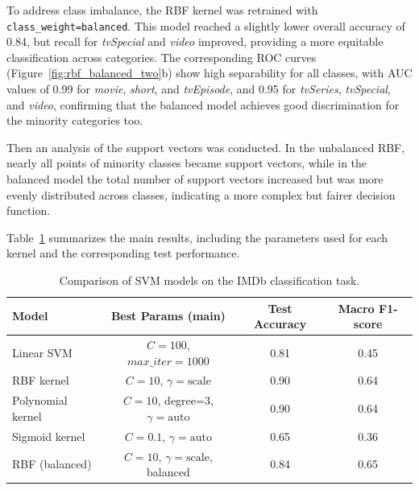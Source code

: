 

To address class imbalance, the RBF kernel was retrained with \texttt{class\_weight=balanced}.
This model reached a slightly lower overall accuracy of 0.84, 
but recall for \textit{tvSpecial} and \textit{video} improved, providing a more equitable classification across categories.  
The corresponding ROC curves (Figure~\ref{fig:rbf_balanced_two}b) show high separability for all classes, 
with AUC values of 0.99 for \textit{movie}, \textit{short}, and \textit{tvEpisode}, and 0.95 for \textit{tvSeries}, 
\textit{tvSpecial}, and \textit{video}, confirming that the balanced model achieves good discrimination 
for the minority categories too. 

Then an analysis of the support vectors was conducted.
In the unbalanced RBF, nearly all points of minority classes became support vectors, 
while in the balanced model the total number of support vectors increased but was more evenly distributed across classes, 
indicating a more complex but fairer decision function. 

Table~\ref{tab:svm_results} summarizes the main results, including the parameters used for each kernel and the corresponding test performance. 


\begin{table}[h]
\centering
\caption{Comparison of SVM models on the IMDb classification task.}
\label{tab:svm_results}
\begin{tabular}{lccc}
\hline
\textbf{Model} & \textbf{Best Params (main)} & \textbf{Test Accuracy} & \textbf{Macro F1-score} \\
\hline
Linear SVM & $C=100$, $max\_iter=1000$ & 0.81 & 0.45 \\
RBF kernel & $C=10$, $\gamma=\text{scale}$ & 0.90 & 0.64 \\
Polynomial kernel & $C=10$, degree=3, $\gamma=\text{auto}$ & 0.90 & 0.64 \\
Sigmoid kernel & $C=0.1$, $\gamma=\text{auto}$ & 0.65 & 0.36 \\
RBF (balanced) & $C=10$, $\gamma=\text{scale}$, balanced & 0.84 & 0.65 \\
\hline
\end{tabular}
\end{table}
    
